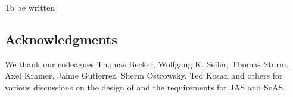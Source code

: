 \documentclass{llncs}
\begin{document}
To be written


\subsection*{Acknowledgments} %

We thank our colleagues Thomas Becker, Wolfgang K. Seiler, Thomas
Sturm, Axel Kramer, Jaime Gutierrez, Sherm Ostrowsky, Ted Kosan and
others for various discussions on the design of and the requirements
for JAS and ScAS. 




\end{document}
